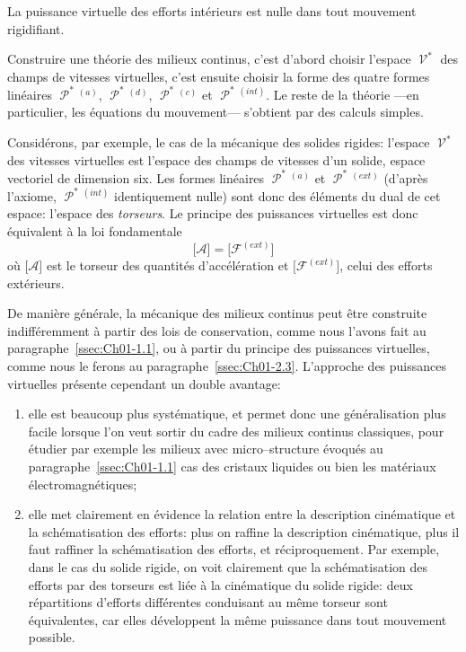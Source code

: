 \begin{Axiome}[Axiome]
    La puissance virtuelle des efforts intérieurs est nulle dans tout mouvement rigidifiant.
\end{Axiome}

Construire une théorie des milieux continus, c'est d'abord choisir l'espace $\mathop{\mathcal{V}}^{\ast}$ des champs de vitesses virtuelles, c'est ensuite choisir la forme des quatre formes linéaires $\mathop{\mathcal{P}}^{\ast}{\!}^{(a)}$, $\mathop{\mathcal{P}}^{\ast}{\!}^{(d)}$, $\mathop{\mathcal{P}}^{\ast}{\!}^{(c)}$ et $\mathop{\mathcal{P}}^{\ast}{\!}^{(int)}$.
Le reste de la théorie ---en particulier, les équations du mouvement--- s'obtient par des calculs simples.

Considérons, par exemple, le cas de la mécanique des solides rigides: l'espace $\mathop{\mathcal{V}}^{\ast}$ des vitesses virtuelles est l'espace des champs de vitesses d'un solide, espace vectoriel de dimension six.
Les formes linéaires $\mathop{\mathcal{P}}^{\ast}{\!}^{(a)}$ et $\mathop{\mathcal{P}}^{\ast}{\!}^{(ext)}$ (d'après l'axiome, $\mathop{\mathcal{P}}^{\ast}{\!}^{(int)}$ identiquement nulle) sont donc des éléments du dual de cet espace: l'espace des \emph{torseurs}.
Le principe des puissances virtuelles est donc équivalent à la loi fondamentale
\begin{equation}
    \bigl[ \mathcal{A} \bigr] = \bigl[ \mathcal{F}^{(ext)} \bigr]
    \label{eq:Ch01-032}
\end{equation}
où $\bigl[ \mathcal{A} \bigr]$ est le torseur des quantités d'accélération et $\bigl[ \mathcal{F}^{(ext)} \bigr]$, celui des efforts extérieurs.

De manière générale, la mécanique des milieux continus peut être construite indifféremment à partir des lois de conservation, comme nous l'avons fait au paragraphe~\ref{ssec:Ch01-1.1}, ou à partir du principe des puissances virtuelles, comme nous le ferons au paragraphe~\ref{ssec:Ch01-2.3}.
L'approche des puissances virtuelles présente cependant un double avantage:
\begin{enumerate}
    \item elle est beaucoup plus systématique, et permet donc une généralisation plus facile lorsque l'on veut sortir du cadre des milieux continus classiques, pour étudier par exemple les milieux avec micro--structure évoqués au paragraphe~\ref{ssec:Ch01-1.1} cas des cristaux liquides ou bien les matériaux électromagnétiques;
    \item elle met clairement en évidence la relation entre la description cinématique et la schématisation des efforts: plus on raffine la description cinématique, plus il faut raffiner la schématisation des efforts, et réciproquement.
        Par exemple, dans le cas du solide rigide, on voit clairement que la schématisation des efforts par des torseurs est liée à la cinématique du solide rigide: deux répartitions d'efforts différentes conduisant au même torseur sont équivalentes, car elles développent la même puissance dans tout mouvement possible.
\end{enumerate}

